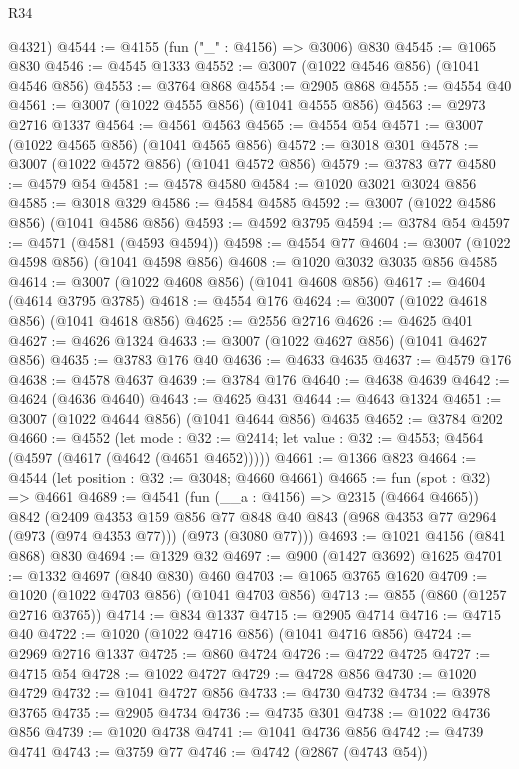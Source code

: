 \begin{lexlean}{R34}
\begin{coremodule}
      @4321)
@4544 := @4155 (fun ("_" : @4156) => @3006) @830
@4545 := @1065 @830
@4546 := @4545 @1333
@4552 := @3007 (@1022 @4546 @856) (@1041 @4546 @856)
@4553 := @3764 @868
@4554 := @2905 @868
@4555 := @4554 @40
@4561 := @3007 (@1022 @4555 @856) (@1041 @4555 @856)
@4563 := @2973 @2716 @1337
@4564 := @4561 @4563
@4565 := @4554 @54
@4571 := @3007 (@1022 @4565 @856) (@1041 @4565 @856)
@4572 := @3018 @301
@4578 := @3007 (@1022 @4572 @856) (@1041 @4572 @856)
@4579 := @3783 @77
@4580 := @4579 @54
@4581 := @4578 @4580
@4584 := @1020 @3021 @3024 @856
@4585 := @3018 @329
@4586 := @4584 @4585
@4592 := @3007 (@1022 @4586 @856) (@1041 @4586 @856)
@4593 := @4592 @3795
@4594 := @3784 @54
@4597 := @4571 (@4581 (@4593 @4594))
@4598 := @4554 @77
@4604 := @3007 (@1022 @4598 @856) (@1041 @4598 @856)
@4608 := @1020 @3032 @3035 @856 @4585
@4614 := @3007 (@1022 @4608 @856) (@1041 @4608 @856)
@4617 := @4604 (@4614 @3795 @3785)
@4618 := @4554 @176
@4624 := @3007 (@1022 @4618 @856) (@1041 @4618 @856)
@4625 := @2556 @2716
@4626 := @4625 @401
@4627 := @4626 @1324
@4633 := @3007 (@1022 @4627 @856) (@1041 @4627 @856)
@4635 := @3783 @176 @40
@4636 := @4633 @4635
@4637 := @4579 @176
@4638 := @4578 @4637
@4639 := @3784 @176
@4640 := @4638 @4639
@4642 := @4624 (@4636 @4640)
@4643 := @4625 @431
@4644 := @4643 @1324
@4651 := @3007 (@1022 @4644 @856) (@1041 @4644 @856) @4635
@4652 := @3784 @202
@4660 := @4552
    (let mode : @32 := @2414; let value : @32 := @4553; @4564 (@4597 (@4617 (@4642 (@4651 @4652)))))
@4661 := @1366 @823
@4664 := @4544 (let position : @32 := @3048; @4660 @4661)
@4665 := fun (spot : @32) => @4661
@4689 := @4541
    (fun (__a : @4156) => @2315 (@4664 @4665))
    @842
    (@2409
      @4353
      @159
      @856
      @77
      @848
      @40
      @843
      (@968 @4353 @77 @2964 (@973 (@974 @4353 @77)))
      (@973 (@3080 @77)))
@4693 := @1021 @4156 (@841 @868) @830
@4694 := @1329 @32
@4697 := @900 (@1427 @3692) @1625
@4701 := @1332 @4697 (@840 @830) @460
@4703 := @1065 @3765 @1620
@4709 := @1020 (@1022 @4703 @856) (@1041 @4703 @856)
@4713 := @855 (@860 (@1257 @2716 @3765))
@4714 := @834 @1337
@4715 := @2905 @4714
@4716 := @4715 @40
@4722 := @1020 (@1022 @4716 @856) (@1041 @4716 @856)
@4724 := @2969 @2716 @1337
@4725 := @860 @4724
@4726 := @4722 @4725
@4727 := @4715 @54
@4728 := @1022 @4727
@4729 := @4728 @856
@4730 := @1020 @4729
@4732 := @1041 @4727 @856
@4733 := @4730 @4732
@4734 := @3978 @3765
@4735 := @2905 @4734
@4736 := @4735 @301
@4738 := @1022 @4736 @856
@4739 := @1020 @4738
@4741 := @1041 @4736 @856
@4742 := @4739 @4741
@4743 := @3759 @77
@4746 := @4742 (@2867 (@4743 @54))

\end{coremodule}
\end{lexlean}
